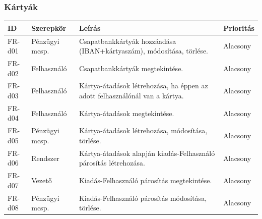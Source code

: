 \documentclass[a4paper,12pt]{article}
\begin{document}
\subsubsection{Kártyák}
\begin{table}[H]
  \centering
  \begin{tabular}{llL{8.5cm}l}
  \toprule
  ID & Szerepkör & Leírás & Prioritás \\
  \midrule
  FR-d01 & Pénzügyi mcsp.   & Csapatbankkártyák hozzáadása (IBAN+kártyaszám), módosítása, törlése.                      & Alacsony\\
  FR-d02 & Felhasználó      & Csapatbankkártyák megtekintése.                                                           & Alacsony\\
  FR-d03 & Felhasználó      & Kártya-átadások létrehozása, ha éppen az adott felhasználónál van a kártya.               & Alacsony\\
  FR-d04 & Felhasználó      & Kártya-átadások megtekintése.                                                             & Alacsony\\
  FR-d05 & Pénzügyi mcsp.   & Kártya-átadások létrehozása, módosítása, törlése.                                         & Alacsony\\
  FR-d06 & Rendszer         & Kártya-átadások alapján kiadás-Felhasználó párosítás létrehozása.                         & Alacsony\\
  FR-d07 & Vezető           & Kiadás-Felhasználó párosítás megtekintése.                                                & Alacsony\\
  FR-d08 & Pénzügyi mcsp.   & Kiadás-Felhasználó párosítás módosítása, törlése.                                         & Alacsony\\
  \bottomrule
  \end{tabular}
\end{table}
\end{document}
